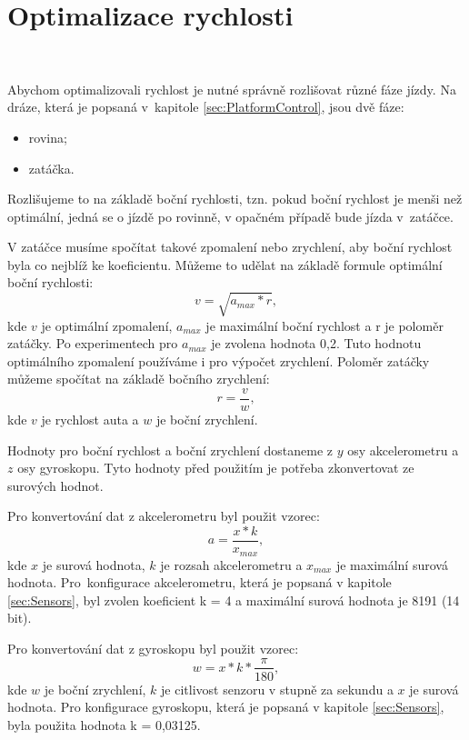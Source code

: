 \chapter{Optimalizace rychlosti}
\label{sec:SpeedOptimization}
\

Abychom optimalizovali rychlost je nutné správně rozlišovat různé fáze jízdy. Na
dráze, která je popsaná v~kapitole \ref{sec:PlatformControl}, jsou dvě fáze:
\begin{itemize}
	\item{rovina;}
	\item{zatáčka.}
\end{itemize}

Rozlišujeme to na základě boční rychlosti, tzn. pokud boční rychlost je menši než
optimální, jedná se o jízdě po rovinně, v opačném případě bude jízda v~zatáčce.

V zatáčce musíme spočítat takové zpomalení nebo zrychlení, aby boční rychlost byla
co nejblíž ke koeficientu. Můžeme to udělat na základě formule optimální boční
rychlosti:
\begin{equation}
v = \sqrt{a_{max} * r},
\end{equation}
kde $v$ je optimální zpomalení, $a_{max}$ je maximální boční rychlost a r je poloměr
zatáčky. Po experimentech pro $a_{max}$ je zvolena hodnota 0,2. Tuto hodnotu
optimálního zpomalení používáme i pro výpočet zrychlení. Poloměr zatáčky můžeme
spočítat na základě bočního zrychlení:
\begin{equation}
r = \frac{v}{w},
\end{equation}
kde $v$ je rychlost auta a $w$ je boční zrychlení.

Hodnoty pro boční rychlost a boční zrychlení dostaneme z $y$ osy akcelerometru a $z$
osy gyroskopu. Tyto hodnoty před použitím je potřeba zkonvertovat ze surových
hodnot.

Pro konvertování dat z akcelerometru byl použit vzorec:
\begin{equation}
a = \frac{x * k}{x_{max}},
\end{equation}
kde $x$ je surová hodnota, $k$ je rozsah akcelerometru a $x_{max}$ je maximální
surová hodnota. Pro~konfigurace akcelerometru, která je popsaná v kapitole
\ref{sec:Sensors}, byl zvolen koeficient k = 4 a maximální surová hodnota je 8191
(14 bit).

Pro konvertování dat z gyroskopu byl použit vzorec:
\begin{equation}
w = x * k * \frac{\pi}{180},
\end{equation}
kde $w$ je boční zrychlení, $k$ je citlivost senzoru v stupně za sekundu a $x$ je
surová hodnota. Pro konfigurace gyroskopu, která je popsaná v kapitole
\ref{sec:Sensors}, byla použita hodnota k = 0,03125.

\endinput
